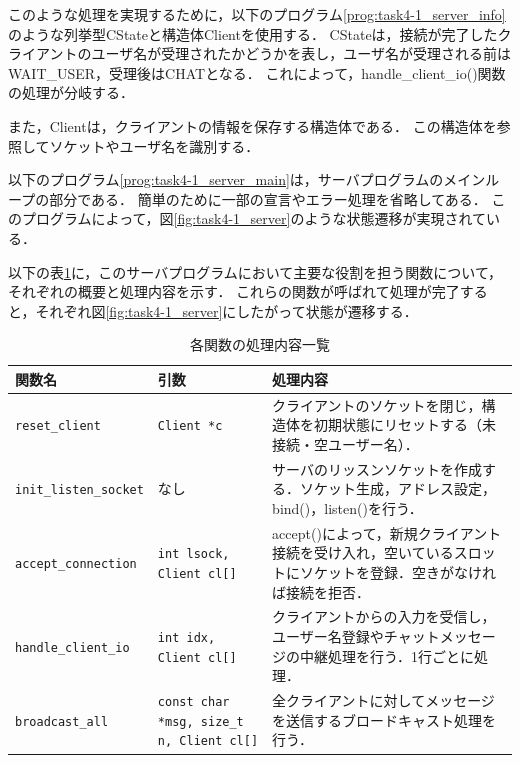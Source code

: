 \documentclass[a4j,10pt]{jarticle}
\begin{document}
このような処理を実現するために，以下のプログラム\ref{prog:task4-1_server_info}のような列挙型CStateと構造体Clientを使用する．
CStateは，接続が完了したクライアントのユーザ名が受理されたかどうかを表し，ユーザ名が受理される前はWAIT\_USER，受理後はCHATとなる．
これによって，handle\_client\_io()関数の処理が分岐する．

また，Clientは，クライアントの情報を保存する構造体である．
この構造体を参照してソケットやユーザ名を識別する．


以下のプログラム\ref{prog:task4-1_server_main}は，サーバプログラムのメインループの部分である．
簡単のために一部の宣言やエラー処理を省略してある．
このプログラムによって，図\ref{fig:task4-1_server}のような状態遷移が実現されている．



以下の表\ref{tab:task4-1_server}に，このサーバプログラムにおいて主要な役割を担う関数について，それぞれの概要と処理内容を示す．
これらの関数が呼ばれて処理が完了すると，それぞれ図\ref{fig:task4-1_server}にしたがって状態が遷移する．
\begin{table}[htbp]
  \centering
  \caption{各関数の処理内容一覧}
  \label{tab:task4-1_server}
  \begin{tabular}{|l|p{3cm}|p{8cm}|}
    \hline
    \textbf{関数名} & \textbf{引数} & \textbf{処理内容} \\
    \hline
    \texttt{reset\_client} & \texttt{Client *c} &
      クライアントのソケットを閉じ，構造体を初期状態にリセットする（未接続・空ユーザー名）． \\
    \hline
    \texttt{init\_listen\_socket} & なし &
      サーバのリッスンソケットを作成する．ソケット生成，アドレス設定，bind()，listen()を行う． \\
    \hline
    \texttt{accept\_connection} & \texttt{int lsock, Client cl[]} &
      accept()によって，新規クライアント接続を受け入れ，空いているスロットにソケットを登録．空きがなければ接続を拒否． \\
    \hline
    \texttt{handle\_client\_io} & \texttt{int idx, Client cl[]} &
      クライアントからの入力を受信し，ユーザー名登録やチャットメッセージの中継処理を行う．1行ごとに処理． \\
    \hline
    \texttt{broadcast\_all} & \texttt{const char *msg, size\_t n, Client cl[]} &
      全クライアントに対してメッセージを送信するブロードキャスト処理を行う． \\
    \hline
  \end{tabular}
\end{table}
\end{document}
